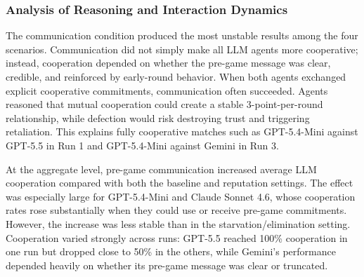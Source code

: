 \documentclass[11pt]{article}
\begin{document}
\begin{table}[H]
\centering
\caption{Scenario D: Pre-Game Communication standings across runs.}
\label{tab:comm_combined_standings}
\scriptsize
{}
\end{table}

\subsubsection{Analysis of Reasoning and Interaction Dynamics}

The communication condition produced the most unstable results among the four scenarios. Communication did not simply make all LLM agents more cooperative; instead, cooperation depended on whether the pre-game message was clear, credible, and reinforced by early-round behavior. When both agents exchanged explicit cooperative commitments, communication often succeeded. Agents reasoned that mutual cooperation could create a stable 3-point-per-round relationship, while defection would risk destroying trust and triggering retaliation. This explains fully cooperative matches such as GPT-5.4-Mini against GPT-5.5 in Run 1 and GPT-5.4-Mini against Gemini in Run 3.

At the aggregate level, pre-game communication increased average LLM cooperation compared with both the baseline and reputation settings. The effect was especially large for GPT-5.4-Mini and Claude Sonnet 4.6, whose cooperation rates rose substantially when they could use or receive pre-game commitments. However, the increase was less stable than in the starvation/elimination setting. Cooperation varied strongly across runs: GPT-5.5 reached 100\% cooperation in one run but dropped close to 50\% in the others, while Gemini's performance depended heavily on whether its pre-game message was clear or truncated.
\end{document}

